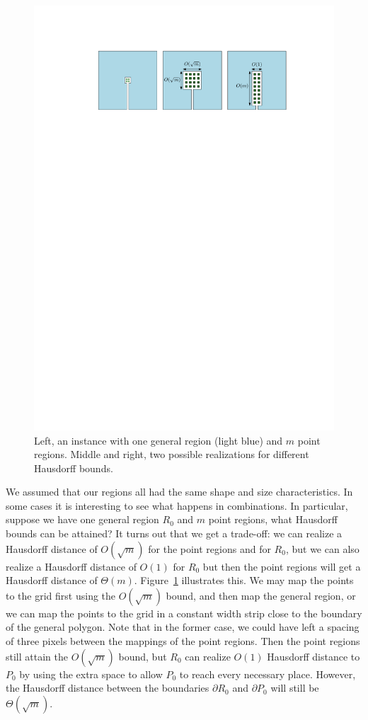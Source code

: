 \documentclass[a4paper, 11pt]{article}
\begin{document}
\begin{figure}[tb]
\centering
\includegraphics[]{pixel-combi.pdf}
\caption{Left, an instance with one general region (light blue) and $m$ point regions. Middle and right, two possible realizations for different Hausdorff bounds.}
\label{fig:combi}
\end{figure}

We assumed that our regions all had the same shape and size characteristics. In some cases it is interesting to see what happens in combinations. In particular, suppose we have one general region $R_0$ and $m$ point regions, what Hausdorff bounds can be attained? It turns out that we get a trade-off: we can realize a Hausdorff distance of $O(\sqrt{m})$ for the point regions and for $R_0$, but we can also realize a Hausdorff distance of $O(1)$ for $R_0$ but then the point regions will get a Hausdorff distance of $\Theta(m)$. Figure~\ref{fig:combi} illustrates this. We may map the points to the grid first using the $O(\sqrt{m})$ bound, and then map the general region, or we can map the points to the grid in a constant width strip close to the boundary of the general polygon. Note that in the former case, we could have left a spacing of three pixels between the mappings of the point regions. Then the point regions still attain the $O(\sqrt{m})$ bound, but $R_0$ can realize $O(1)$ Hausdorff distance to $P_0$ by using the extra space to allow $P_0$ to reach every necessary place. However, the Hausdorff distance between the boundaries $\partial R_0$ and $\partial P_0$ will still be $\Theta(\sqrt{m})$.
\end{document}
